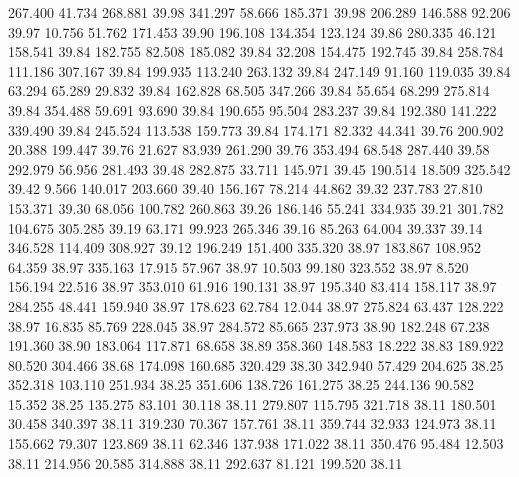  267.400   41.734  268.881        39.98
 341.297   58.666  185.371        39.98
 206.289  146.588   92.206        39.97
  10.756   51.762  171.453        39.90
 196.108  134.354  123.124        39.86
 280.335   46.121  158.541        39.84
 182.755   82.508  185.082        39.84
  32.208  154.475  192.745        39.84
 258.784  111.186  307.167        39.84
 199.935  113.240  263.132        39.84
 247.149   91.160  119.035        39.84
  63.294   65.289   29.832        39.84
 162.828   68.505  347.266        39.84
  55.654   68.299  275.814        39.84
 354.488   59.691   93.690        39.84
 190.655   95.504  283.237        39.84
 192.380  141.222  339.490        39.84
 245.524  113.538  159.773        39.84
 174.171   82.332   44.341        39.76
 200.902   20.388  199.447        39.76
  21.627   83.939  261.290        39.76
 353.494   68.548  287.440        39.58
 292.979   56.956  281.493        39.48
 282.875   33.711  145.971        39.45
 190.514   18.509  325.542        39.42
   9.566  140.017  203.660        39.40
 156.167   78.214   44.862        39.32
 237.783   27.810  153.371        39.30
  68.056  100.782  260.863        39.26
 186.146   55.241  334.935        39.21
 301.782  104.675  305.285        39.19
  63.171   99.923  265.346        39.16
  85.263   64.004   39.337        39.14
 346.528  114.409  308.927        39.12
 196.249  151.400  335.320        38.97
 183.867  108.952   64.359        38.97
 335.163   17.915   57.967        38.97
  10.503   99.180  323.552        38.97
   8.520  156.194   22.516        38.97
 353.010   61.916  190.131        38.97
 195.340   83.414  158.117        38.97
 284.255   48.441  159.940        38.97
 178.623   62.784   12.044        38.97
 275.824   63.437  128.222        38.97
  16.835   85.769  228.045        38.97
 284.572   85.665  237.973        38.90
 182.248   67.238  191.360        38.90
 183.064  117.871   68.658        38.89
 358.360  148.583   18.222        38.83
 189.922   80.520  304.466        38.68
 174.098  160.685  320.429        38.30
 342.940   57.429  204.625        38.25
 352.318  103.110  251.934        38.25
 351.606  138.726  161.275        38.25
 244.136   90.582   15.352        38.25
 135.275   83.101   30.118        38.11
 279.807  115.795  321.718        38.11
 180.501   30.458  340.397        38.11
 319.230   70.367  157.761        38.11
 359.744   32.933  124.973        38.11
 155.662   79.307  123.869        38.11
  62.346  137.938  171.022        38.11
 350.476   95.484   12.503        38.11
 214.956   20.585  314.888        38.11
 292.637   81.121  199.520        38.11
